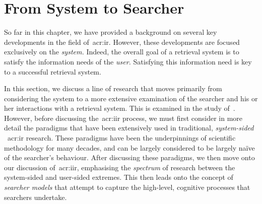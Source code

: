 %

\section{From System to Searcher}\label{sec:ir_background:user}
So far in this chapter, we have provided a background on several key developments in the field of~\gls{acr:ir}. However, these developments are focused exclusively on the \emph{system.} Indeed, the overall goal of a retrieval system is to satisfy the information needs of the \emph{user.} Satisfying this information need is key to a successful retrieval system.

In this section, we discuss a line of research that moves primarily from considering the system to a more extensive examination of the searcher and his or her interactions with a retrieval system. This is examined in the study of~. However, before discussing the~\gls{acr:iir} process, we must first consider in more detail the paradigms that have been extensively used in traditional, \emph{system-sided} ~\gls{acr:ir} research. These paradigms have been the underpinnings of scientific methodology for many decades, and can be largely considered to be largely na\"{i}ve of the searcher's behaviour. After discussing these paradigms, we then move onto our discussion of~\gls{acr:iir}, emphasising the \emph{spectrum} of research between the system-sided and user-sided extremes. This then leads onto the concept of \emph{searcher models} that attempt to capture the high-level, cognitive processes that searchers undertake.

